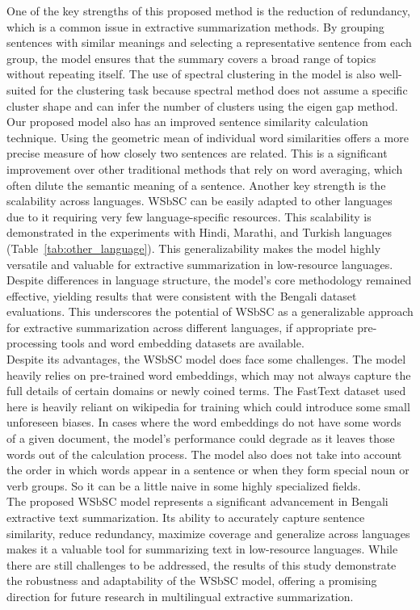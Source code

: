 One of the key strengths of this proposed method is the reduction of redundancy, which is a common issue in extractive summarization methods. By grouping sentences with similar meanings and selecting a representative sentence from each group, the model ensures that the summary covers a broad range of topics without repeating itself. The use of spectral clustering in the model is also well-suited for the clustering task because spectral method does not assume a specific cluster shape and can infer the number of clusters using the eigen gap method. Our proposed model also has an improved sentence similarity calculation technique. Using the geometric mean of individual word similarities offers a more precise measure of how closely two sentences are related. This is a significant improvement over other traditional methods that rely on word averaging, which often dilute the semantic meaning of a sentence. Another key strength is the scalability across languages. WSbSC can be easily adapted to other languages due to it requiring very few language-specific resources. This scalability is demonstrated in the experiments with Hindi, Marathi, and Turkish languages (Table~\ref{tab:other_language}). This generalizability makes the model highly versatile and valuable for extractive summarization in low-resource languages. Despite differences in language structure, the model’s core methodology remained effective, yielding results that were consistent with the Bengali dataset evaluations. This underscores the potential of WSbSC as a generalizable approach for extractive summarization across different languages, if appropriate pre-processing tools and word embedding datasets are available.\\

Despite its advantages, the WSbSC model does face some challenges. The model heavily relies on pre-trained word embeddings, which may not always capture the full details of certain domains or newly coined terms. The FastText \cite{grave-etal-2018-fasttext} dataset used here is heavily reliant on wikipedia for training which could introduce some small unforeseen biases. In cases where the word embeddings do not have some words of a given document, the model’s performance could degrade as it leaves those words out of the calculation process. The model also does not take into account the order in which words appear in a sentence or when they form special noun or verb groups. So it can be a little naive in some highly specialized fields.\\

The proposed WSbSC model represents a significant advancement in Bengali extractive text summarization. Its ability to accurately capture sentence similarity, reduce redundancy, maximize coverage and generalize across languages makes it a valuable tool for summarizing text in low-resource languages. While there are still challenges to be addressed, the results of this study demonstrate the robustness and adaptability of the WSbSC model, offering a promising direction for future research in multilingual extractive summarization.

